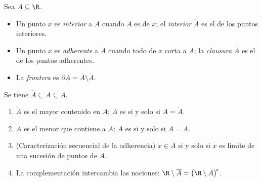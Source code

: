 \begin{definition}\label{def:b1:topology:closure}
Sea $A \subseteq \R$.
\begin{itemize}
  \item Un punto $x$ es \emph{interior} a $A$ cuando $A$ es
         de $x$; el \emph{interior}
        $\mathring{A}$ es el  de los puntos
        interiores.
  \item Un punto $x$ es \emph{adherente} a $A$ cuando todo 
        de $x$ corta a $A$; la \emph{clausura}
        $\overline{A}$ es el  de los puntos
        adherentes.
  \item La \emph{frontera} es $\partial A = \overline A \setminus
        \mathring A$.
\end{itemize}
Se tiene $\mathring A \subseteq A \subseteq \overline A$.
\end{definition}

\begin{proposition}\label{prop:b1:topology:closureprops}
\begin{enumerate}
  \item $\mathring A$ es el mayor  contenido en $A$; $A$ es
         si y solo si $A = \mathring A$.
  \item $\overline A$ es el menor  que contiene a $A$; $A$ es
         si y solo si $A = \overline A$.
  \item (Caracterización secuencial de la adherencia)
        $x \in \overline A$ si y solo si $x$ es límite de una sucesión
        de puntos de $A$.
  \item La complementación intercambia las nociones: $\R \setminus
        \overline A = \bigl(\R \setminus A\bigr)^{\!\circ}$.
\end{enumerate}
\end{proposition}

